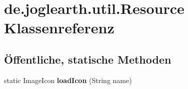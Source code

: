 \section{de.\-joglearth.\-util.\-Resource Klassenreferenz}
\label{classde_1_1joglearth_1_1util_1_1_resource}
\subsection*{Öffentliche, statische Methoden}
\begin{DoxyCompactItemize}
\item 
static Image\-Icon {\bfseries load\-Icon} (String name)\label{classde_1_1joglearth_1_1util_1_1_resource_a0a34e861a5a69284adae6f72c4d2f16e}

\end{DoxyCompactItemize}
